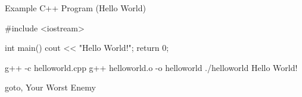 \documentclass[../lecture1-introduction.tex]{subfiles}
\begin{document}
\begin{frame}[fragile]{Example C++ Program (Hello World)}
    \begin{cppcode}[]
#include <iostream>

int main()
{
    cout << "Hello World!";
    return 0;
}
    \end{cppcode}

    \begin{commandshell}
g++ -c helloworld.cpp
g++ helloworld.o -o helloworld
./helloworld
Hello World!
    \end{commandshell}
\end{frame}


\begin{frame}[fragile]{goto, Your Worst Enemy}
    \begin{center}
    \end{center}
\end{frame}

\end{document}
